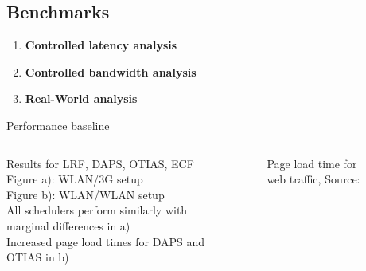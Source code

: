 \documentclass{beamer}
\begin{document}
\subsection{Benchmarks}
\begin{frame}{}
  \begin{enumerate}
    \setlength\itemsep{2.5em}
    \Large
    \item \textcolor{uos-red-full}{\textbf{Controlled latency analysis}}
    \item \textcolor{uos-red-full}{\textbf{Controlled bandwidth analysis}}
    \item \textcolor{uos-red-full}{\textbf{Real-World analysis}}
  \end{enumerate}
\end{frame}

\begin{frame}{Performance baseline}
  \begin{columns}
    \vspace{-2cm}
    \begin{column}{0.38\textwidth}
      \small
        \bull{} Results for LRF, DAPS, OTIAS, ECF\\
        \vspace{0.3cm}
        \bull{} Figure a): WLAN/3G setup \\
        \vspace{0.3cm}
        \bull{} Figure b): WLAN/WLAN setup\\
        \vspace{0.3cm}
        \bull{} All schedulers perform similarly with marginal differences in a)\\
        \vspace{0.3cm}
        \bull{} Increased page load times for DAPS and OTIAS in b)\\
    \end{column}
    \begin{column}{0.58\textwidth}
      \vspace{-0.8cm}
      \begin{figure}
        \centering
        \vspace{-0.2cm}
        \caption{\footnotesize Page load time for web traffic, \textcolor{uos-grey-full}{Source: {\cite{lowlatschedulers}}}}
      \end{figure}
    \end{column}
  \end{columns}
\end{frame}
\end{document}
